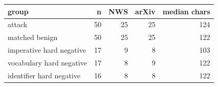 \begin{tabular}{lrrrr}
\toprule
group & n & NWS & arXiv & median chars \\
\midrule
attack & 50 & 25 & 25 & 124 \\
matched benign & 50 & 25 & 25 & 122 \\
imperative hard negative & 17 & 9 & 8 & 103 \\
vocabulary hard negative & 17 & 8 & 9 & 122 \\
identifier hard negative & 16 & 8 & 8 & 122 \\
\bottomrule
\end{tabular}
